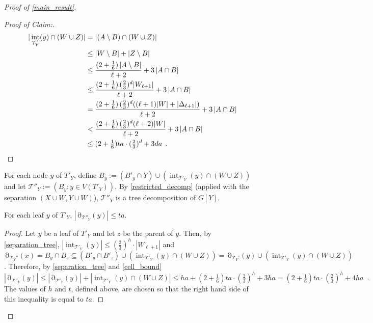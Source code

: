 \documentclass{patmorin}
\newenvironment{clmproof}{\begin{proof}[Proof of Claim:]\renewcommand{\qedsymbol}{\rule{1ex}{1ex}}}{\end{proof}}
\DeclareMathOperator{\interior}{int}
\DeclareMathOperator{\boundary}{\partial}
\begin{document}
\begin{proof}[Proof of \cref{main_result}]
\begin{clmproof}
  \begin{align*}
  |\interior_{\mathcal{T}'_Y}(y)\cap (W\cup Z)|
  & = |(A\setminus B)\cap (W\cup Z)| \\
  & \le |W\setminus B| + |Z\setminus B| \\
  & \le
     \frac{(2+\tfrac{1}{6})\,|A\setminus B|}{\ell+2} + 3\,|A\cap B| \\
  & \le \frac{(2+\tfrac{1}{6})\,(\tfrac{2}{3})^d|W_{\ell+1}|}{\ell+2} + 3\,|A\cap B| \\
  & = \frac{(2+\tfrac{1}{6})\,(\tfrac{2}{3})^d((\ell+1)|W|+|\Delta_{\ell+1}|)}{\ell+2} + 3\,|A\cap B| \\
  & < \frac{(2+\tfrac{1}{6})\,(\tfrac{2}{3})^d(\ell+2)|W|}{\ell+2} + 3\,|A\cap B| \\
  & \le (2+\tfrac{1}{6})ta\cdot(\tfrac{2}{3})^d + 3da \enspace . \qedhere
  \end{align*}
  \end{clmproof}

 For each node $y$ of $T'_Y$, define $B_y:=(B'_y\cap Y) \cup (\interior_{\mathcal{T}'_Y}(y)\cap (W\cup Z))$ and let $\mathcal{T}''_Y:=(B_y:y\in V(T'_Y))$.  By \cref{restricted_decomp} (applied with the separation $(X\cup W,Y\cup W)$), $\mathcal{T}''_Y$ is a tree decomposition of $G[Y]$.

 \begin{clm}\label{leaf_interface}
    For each leaf $y$ of $T'_Y$, $|\boundary_{\mathcal{T}''_Y}(y)|\le ta$.
 \end{clm}
 \begin{proof}
   Let $y$ be a leaf of $T'_Y$ and let $z$ be the parent of $y$.  Then, by \cref{separation_tree}, $|\interior_{\mathcal{T}'_Y}(y)|\le (\tfrac{2}{3})^h\cdot |W_{\ell+1}|$ and $\boundary_{\mathcal{T}_Y''}(x)=B_y\cap B_z\subseteq (B'_y\cap B'_z)\cup(\interior_{\mathcal{T}'_Y}(y)\cap (W\cup Z)) = \boundary_{\mathcal{T}_Y'}(y)\cup(\interior_{\mathcal{T}'_Y}(y)\cap (W\cup Z))$. Therefore, by \cref{separation_tree} and \cref{cell_bound}
   \[
     |\boundary_{\mathcal{T}''_Y}(y)| \le |\boundary_{\mathcal{T}'_Y}(y)| + |\interior_{\mathcal{T}'_Y}(y)\cap (W\cup Z)| \le ha + (2+\tfrac{1}{6})ta\cdot(\tfrac{2}{3})^{h} + 3ha =  (2+\tfrac{1}{6})ta\cdot(\tfrac{2}{3})^{h} + 4ha\enspace .
   \]
   The values of $h$ and $t$, defined above, are chosen so that the right hand side of this inequality is equal to $ta$.
 \end{proof}


\end{proof}
\end{document}
